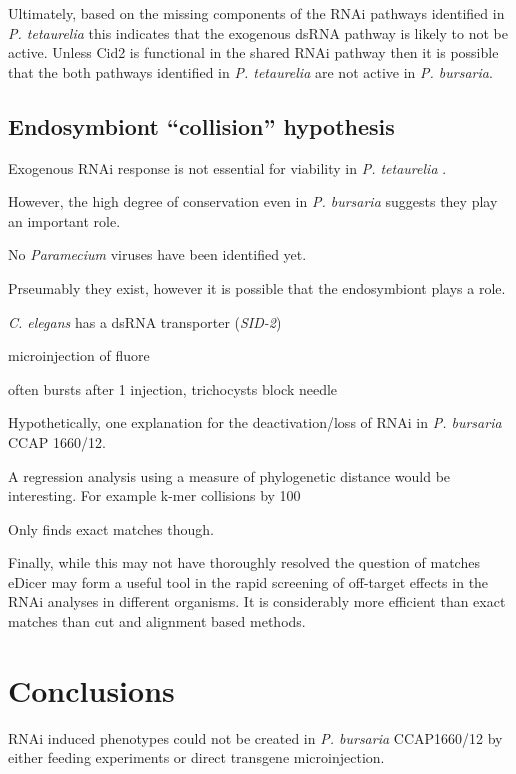 Ultimately, based on the missing components of the RNAi pathways
identified in \textit{P. tetaurelia} this indicates that the exogenous dsRNA
pathway is likely to not be active.  Unless Cid2 is functional in the shared
RNAi pathway then it is possible that the both pathways identified in \textit{P. tetaurelia}
are not active in \textit{P. bursaria}.  

\subsection{Endosymbiont ``collision'' hypothesis}

Exogenous RNAi response is not essential for viability in \textit{P. tetaurelia}
\citep{Marker2014}.

However, the high degree of conservation even in \textit{P. bursaria}
suggests they play an important role. 

No \textit{Paramecium} viruses have been identified yet. 

Prseumably they exist, however it is possible that the endosymbiont plays a role.


\textit{C. elegans} has a dsRNA transporter (\textit{SID-2}) \citep{Nuez2012}


microinjection of fluore

often bursts after 1 injection, trichocysts block needle





Hypothetically, one explanation for the deactivation/loss
of RNAi in \textit{P. bursaria} CCAP 1660/12.


A regression analysis using a measure of phylogenetic distance would be interesting.
For example k-mer collisions by 100


Only finds exact matches though.


Finally, while this may not have thoroughly resolved the question of matches
eDicer may form a useful tool in the rapid screening of off-target effects
in the RNAi analyses in different organisms.   It is considerably
more efficient than exact matches 
than cut and alignment based methods. 





\section{Conclusions}

RNAi induced phenotypes could not be created in \textit{P. bursaria} CCAP1660/12
by either feeding experiments or direct transgene microinjection. 

